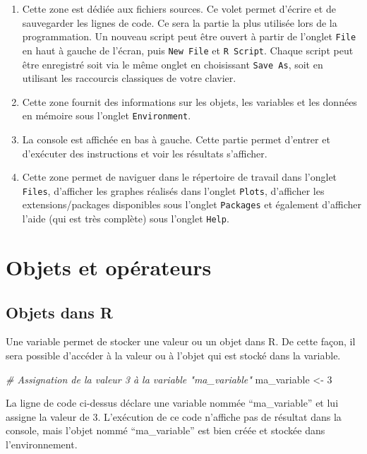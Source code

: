 \documentclass[
]{book}
\newenvironment{Shaded}{\begin{snugshade}}{\end{snugshade}}
\newcommand{\CommentTok}[1]{\textcolor[rgb]{0.56,0.35,0.01}{\textit{#1}}}
\newcommand{\DecValTok}[1]{\textcolor[rgb]{0.00,0.00,0.81}{#1}}
\newcommand{\NormalTok}[1]{#1}
\newcommand{\OtherTok}[1]{\textcolor[rgb]{0.56,0.35,0.01}{#1}}
\providecommand{\tightlist}{%
  \setlength{\itemsep}{0pt}\setlength{\parskip}{0pt}}
\begin{document}
\begin{enumerate}
\def\labelenumi{\arabic{enumi}.}
\tightlist
\item
  Cette zone est dédiée aux fichiers sources. Ce volet permet d'écrire et de sauvegarder les lignes de code. Ce sera la partie la plus utilisée lors de la programmation. Un nouveau script peut être ouvert à partir de l'onglet \texttt{File} en haut à gauche de l'écran, puis \texttt{New\ File} et \texttt{R\ Script}. Chaque script peut être enregistré soit via le même onglet en choisissant \texttt{Save\ As}, soit en utilisant les raccourcis classiques de votre clavier.
\item
  Cette zone fournit des informations sur les objets, les variables et les données en mémoire sous l'onglet \texttt{Environment}.
\item
  La console est affichée en bas à gauche. Cette partie permet d'entrer et d'exécuter des instructions et voir les résultats s'afficher.
\item
  Cette zone permet de naviguer dans le répertoire de travail dans l'onglet \texttt{Files}, d'afficher les graphes réalisés dans l'onglet \texttt{Plots}, d'afficher les extensions/packages disponibles sous l'onglet \texttt{Packages} et également d'afficher l'aide (qui est très complète) sous l'onglet \texttt{Help}.
\end{enumerate}

\chapter{Objets et opérateurs}\label{objets-et-opuxe9rateurs}

\section{Objets dans R}\label{objets-dans-r}

Une variable permet de stocker une valeur ou un objet dans R. De cette façon, il sera possible d'accéder à la valeur ou à l'objet qui est stocké dans la variable.

\begin{Shaded}
\begin{Highlighting}[]
\CommentTok{\# Assignation de la valeur 3 à la variable "ma\_variable"}
\NormalTok{ma\_variable }\OtherTok{\textless{}{-}} \DecValTok{3}
\end{Highlighting}
\end{Shaded}

La ligne de code ci-dessus déclare une variable nommée ``ma\_variable'' et lui assigne la valeur de 3. L'exécution de ce code n'affiche pas de résultat dans la console, mais l'objet nommé ``ma\_variable'' est bien créée et stockée dans l'environnement.
\end{document}
